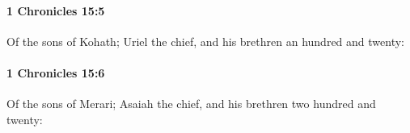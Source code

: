 		\paragraph{1 Chronicles 15:5} %
			\label{1CHRONICLES-15-5}

			Of the sons of Kohath; Uriel the chief, and his brethren an hundred and twenty:


		\paragraph{1 Chronicles 15:6} %
			\label{1CHRONICLES-15-6}

			Of the sons of Merari; Asaiah the chief, and his brethren two hundred and twenty:


